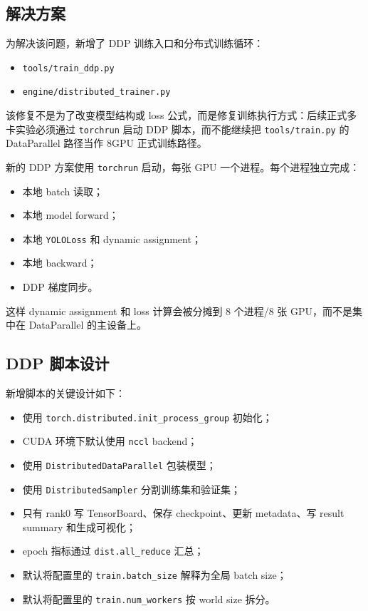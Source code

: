 \documentclass[UTF8]{ctexart}
\begin{document}
\subsection{解决方案}

为解决该问题，新增了 DDP 训练入口和分布式训练循环：

\begin{itemize}[leftmargin=2em]
  \item \texttt{tools/train\_ddp.py}
  \item \texttt{engine/distributed\_trainer.py}
\end{itemize}

该修复不是为了改变模型结构或 loss 公式，而是修复训练执行方式：后续正式多卡实验必须通过 \texttt{torchrun} 启动 DDP 脚本，而不能继续把 \texttt{tools/train.py} 的 DataParallel 路径当作 8GPU 正式训练路径。

新的 DDP 方案使用 \texttt{torchrun} 启动，每张 GPU 一个进程。每个进程独立完成：

\begin{itemize}[leftmargin=2em]
  \item 本地 batch 读取；
  \item 本地 model forward；
  \item 本地 \texttt{YOLOLoss} 和 dynamic assignment；
  \item 本地 backward；
  \item DDP 梯度同步。
\end{itemize}

这样 dynamic assignment 和 loss 计算会被分摊到 8 个进程/8 张 GPU，而不是集中在 DataParallel 的主设备上。

\subsection{DDP 脚本设计}

新增脚本的关键设计如下：

\begin{itemize}[leftmargin=2em]
  \item 使用 \texttt{torch.distributed.init\_process\_group} 初始化；
  \item CUDA 环境下默认使用 \texttt{nccl} backend；
  \item 使用 \texttt{DistributedDataParallel} 包装模型；
  \item 使用 \texttt{DistributedSampler} 分割训练集和验证集；
  \item 只有 rank0 写 TensorBoard、保存 checkpoint、更新 metadata、写 result summary 和生成可视化；
  \item epoch 指标通过 \texttt{dist.all\_reduce} 汇总；
  \item 默认将配置里的 \texttt{train.batch\_size} 解释为全局 batch size；
  \item 默认将配置里的 \texttt{train.num\_workers} 按 world size 拆分。
\end{itemize}
\end{document}
